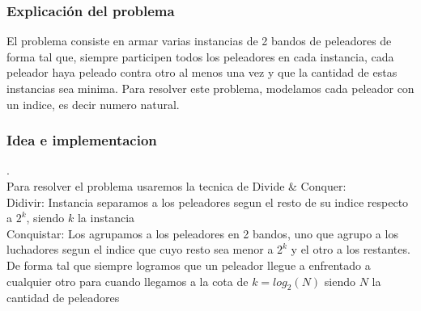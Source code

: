 \subsubsection{Explicación del problema}
El problema consiste en armar varias instancias de 2 bandos de peleadores de forma tal que, siempre participen todos los peleadores en cada instancia, cada peleador haya peleado contra otro al menos una vez y que la cantidad de estas instancias sea minima.
Para resolver este problema, modelamos cada peleador con un indice, es decir numero natural.
\subsubsection{Idea e implementacion}
.\\
Para resolver el problema usaremos la tecnica de Divide \& Conquer: \\
	Didivir: Instancia separamos a los peleadores segun el resto de su indice respecto a $2^k$, siendo $k$ la instancia \\
	Conquistar: Los agrupamos a los peleadores en 2 bandos, uno que agrupo a los luchadores segun el indice que cuyo resto sea menor a $2^k$ y el otro a los restantes. \\

De forma tal que siempre logramos que un peleador llegue a enfrentado a cualquier otro para cuando llegamos a la cota de $k = log_2 (N)$ siendo $N$ la cantidad de peleadores


